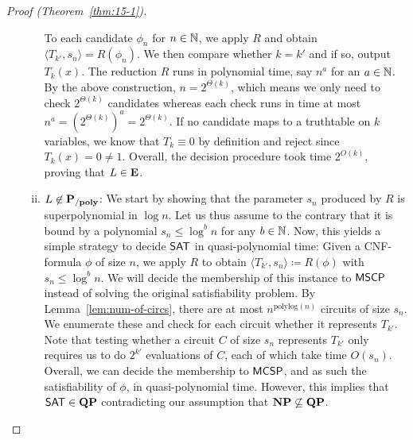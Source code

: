 \documentclass[11pt]{article}
\begin{document}
\begin{proof}[Proof (Theorem~\ref{thm:15-1})]
\begin{itemize}
\begin{enumerate}[(i)]
          To each candidate $\phi_n$ for $n \in {\mathbb{N}}$, we apply $R$ and obtain
          $\langle T_{k'}, s_n \rangle = R(\phi_n)$.
          We then compare whether $k = k'$ and if so, output $T_k(x)$.
          The reduction $R$ runs in polynomial time, say $n^a$ for an
          $a \in {\mathbb{N}}$.
          By the above construction, $n = 2^{\Theta(k)}$, which means we
          only need to check $2^{\Theta(k)}$ candidates whereas each check
          runs in time at most $n^a = (2^{\Theta(k)})^a = 2^{\Theta(k)}$.
          If no candidate maps to a truthtable on $k$ variables, we know
          that $T_k \equiv 0$ by definition and reject since
          $T_k(x) = 0 \not= 1$.
          Overall, the decision procedure took time $2^{O(k)}$, proving
          that $L \in \mathbf{E}$.

        \item $L \not\in \mathbf{P_{/poly}}$:
          We start by showing that the parameter $s_n$ produced by $R$ is
          superpolynomial in $\log n$.
          Let us thus assume to the contrary that it is bound by a polynomial
          $s_n \le \log^b n$ for any $b \in {\mathbb{N}}$.
          Now, this yields a simple strategy to decide $\mathsf{SAT}$ in
          quasi-polynomial time:
          Given a CNF-formula $\phi$ of size $n$, we apply
          $R$ to obtain $\langle T_{k'}, s_n \rangle \coloneqq R(\phi)$
          with $s_n \le \log^b n$.
          We will decide the membership of this instance to
          $\mathsf{MSCP}$ instead of solving
          the original satisfiability problem.
          By Lemma~\ref{lem:num-of-circs}, there are at most
          $n^{\mathrm{polylog}(n)}$ circuits of size $s_n$.
          We enumerate these and check for each circuit whether
          it represents $T_{k'}$.
          Note that testing whether a circuit $C$ of size $s_n$ represents
          $T_{k'}$ only requires us to do $2^{k'}$ evaluations of $C$, each of
          which take time $O(s_n)$.
          Overall, we can decide the membership to $\mathsf{MCSP}$, and
          as such the satisfiability of $\phi$, in quasi-polynomial time.
          However, this implies that $\mathsf{SAT} \in \mathbf{QP}$
          contradicting our assumption that $\mathbf{NP} \not\subseteq \mathbf{QP}$.


\end{enumerate}
\end{itemize}
\end{proof}
\end{document}
